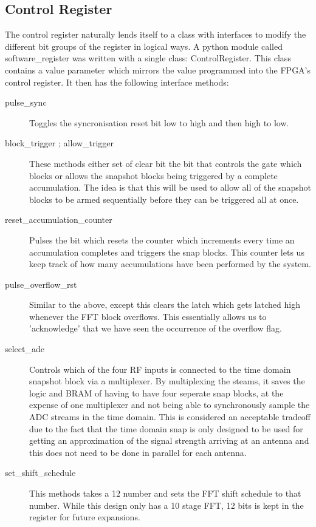 \subsection{Control Register}
The control register naturally lends itself to a class with interfaces to modify the different bit groups of the register in logical ways.
A python module called software\_register was written with a single class: ControlRegister. This class contains a value parameter which mirrors the value programmed into the FPGA's control register. It then has the following interface methods:
\begin{description}
  \item[pulse\_sync] Toggles the syncronisation reset bit low to high and then high to low.
  \item[block\_trigger ; allow\_trigger] These methods either set of clear bit the bit that controls the gate which blocks or allows the snapshot blocks being triggered by a complete accumulation. The idea is that this will be used to allow all of the snapshot blocks to be armed sequentially before they can be triggered all at once.
  \item[reset\_accumulation\_counter] Pulses the bit which resets the counter which increments every time an accumulation completes and triggers the snap blocks. This counter lets us keep track of how many accumulations have been performed by the system.
  \item[pulse\_overflow\_rst] Similar to the above, except this clears the latch which gets latched high whenever the FFT block overflows. This essentially allows us to 'acknowledge' that we have seen the occurrence of the overflow flag.
  \item[select\_adc] Controls which of the four RF inputs is connected to the time domain snapshot block via a multiplexer. By multiplexing the steams, it saves the logic and BRAM of having to have four seperate snap blocks, at the expense of one multiplexer and not being able to synchronously sample the ADC streams in the time domain. This is considered an acceptable tradeoff due to the fact that the time domain snap is only designed to be used for getting an approximation of the signal strength arriving at an antenna and this does not need to be done in parallel for each antenna.
  \item[set\_shift\_schedule] This methods takes a \SI{12}{\bit} number and sets the FFT shift schedule to that number. While this design only has a 10 stage FFT, 12 bits is kept in the register for future expansions.
\end{description}


